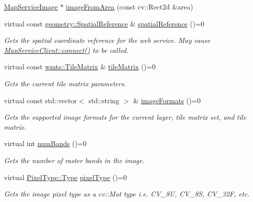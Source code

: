 \begin{DoxyCompactItemize}
\item 
\hyperlink{classdg_1_1deepcore_1_1imagery_1_1_map_service_image}{Map\+Service\+Image} $\ast$ \hyperlink{classdg_1_1deepcore_1_1imagery_1_1_map_service_client_ae3953f6db4d12288407356bbb2fcbc59}{image\+From\+Area} (const cv\+::\+Rect2d \&area)
\item 
virtual const \hyperlink{classdg_1_1deepcore_1_1geometry_1_1_spatial_reference}{geometry\+::\+Spatial\+Reference} \& \hyperlink{group___imagery_module_ga12013189aa3bae04ed159d917d41ab63}{spatial\+Reference} ()=0
\begin{DoxyCompactList}\small\item\em Gets the spatial coordinate reference for the web service. May cause \hyperlink{group___imagery_module_ga5e5f58c725cafba7966936f688a6ade0}{Map\+Service\+Client\+::connect()} to be called. \end{DoxyCompactList}\item 
virtual const \hyperlink{structdg_1_1deepcore_1_1imagery_1_1wmts_1_1_tile_matrix}{wmts\+::\+Tile\+Matrix} \& \hyperlink{group___imagery_module_ga0f308a2d98dc9f34b8ca651576265449}{tile\+Matrix} ()=0
\begin{DoxyCompactList}\small\item\em Gets the current tile matrix parameters. \end{DoxyCompactList}\item 
virtual const std\+::vector$<$ std\+::string $>$ \& \hyperlink{group___imagery_module_ga48b6f633e02c44d955b4d4b1b8352b57}{image\+Formats} ()=0
\begin{DoxyCompactList}\small\item\em Gets the supported image formats for the current layer, tile matrix set, and tile matrix. \end{DoxyCompactList}\item 
virtual int \hyperlink{group___imagery_module_ga7b7d8333be9d5386d8ddca5148b041b5}{num\+Bands} ()=0
\begin{DoxyCompactList}\small\item\em Gets the number of raster bands in the image. \end{DoxyCompactList}\item 
virtual \hyperlink{namespacedg_1_1deepcore_1_1imagery_1_1_pixel_type_a5f0c62edf4601cbd15e52b381697069d}{Pixel\+Type\+::\+Type} \hyperlink{group___imagery_module_gaac6e8dc94732e24fcc43bb8662990363}{pixel\+Type} ()=0
\begin{DoxyCompactList}\small\item\em Gets the image pixel type as a cv\+::\+Mat type i.\+e. C\+V\+\_\+8U, C\+V\+\_\+8S, C\+V\+\_\+32F, etc. \end{DoxyCompactList}\item 

\end{DoxyCompactItemize}
